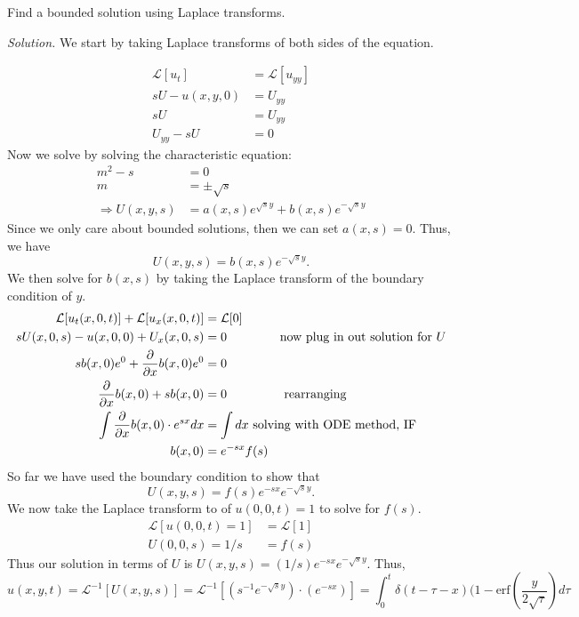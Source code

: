 \documentclass{article}
\begin{document}
Find a bounded solution using Laplace transforms. 

\vspace{3mm}
\textit{Solution.} We start by taking Laplace transforms of both sides of the equation. 

\begin{align*}
\mathcal{L}[u_t] &= \mathcal{L}[u_{yy}] \\
sU - u(x,y,0) &= U_{yy} \\
sU &= U_{yy} \\
U_{yy} - sU &=0 
\end{align*}
Now we solve by solving the characteristic equation:
\begin{align*}
m^2-s &=0  \\
m &= \pm \sqrt{s}   \\
\Rightarrow U(x,y,s) &= a(x,s) e^{\sqrt{s}y} + b(x,s)e^{-\sqrt{s}y} 
\end{align*}
Since we only care about bounded solutions, then we can set \( a(x,s) = 0 \). Thus, we have
\[
U(x,y,s) = b(x,s)e^{-\sqrt{s}y}. 
\]
We then solve for \(b(x,s)\) by taking the Laplace transform of the boundary condition of \(y\). 
\begin{align*}
\mathcal{L}[u_t(x,0,t)] + \mathcal{L}[u_x(x,0,t)] &= \mathcal{L}[0] \\
sU(x,0,s) -u(x,0,0) + U_x(x,0,s) &= 0  \hspace{15mm} \text{now plug in out solution for } U\\
sb(x,0)e^0 + \frac{\partial}{\partial x} b(x,0)e^0 &= 0  \\
\frac{\partial}{\partial x} b(x,0) + sb(x,0)  &=0     \hspace{15mm} \text{ rearranging} \\
\int \frac{\partial}{\partial x} b(x,0)\cdot e^{sx} dx &= \int dx \text{ solving with ODE method, IF}\\ 
b(x,0) &= e^{-sx} f(s) 
\end{align*}
So far we have used the boundary condition to show that 
\[
U(x,y,s) = f(s) e^{-sx} e^{-\sqrt{s} y}.
\]
We now take the Laplace transform to of \(u(0,0,t)=1 \) to solve for \(f(s)\). 
\begin{align*}
\mathcal{L}[u(0,0,t)=1] &= \mathcal{L}[1] \\
U(0,0,s) = 1/s &= f(s) 
\end{align*}
Thus our solution in terms of \(U\) is \( U(x,y,s)= (1/s)e^{-sx} e^{ -\sqrt{s} y}\).
Thus, \[ 
u(x,y,t) = \mathcal{L}^{-1}[U(x,y,s)]=\mathcal{L}^{-1}[ \left(s^{-1}e^{ -\sqrt{s} y}\right) \cdot \left( e^{-sx}  \right)]=\int_0^t \delta(t-\tau-x) (1-\text{erf}(\frac{y}{2\sqrt{\tau}} ) d\tau 
\]
\end{document}

